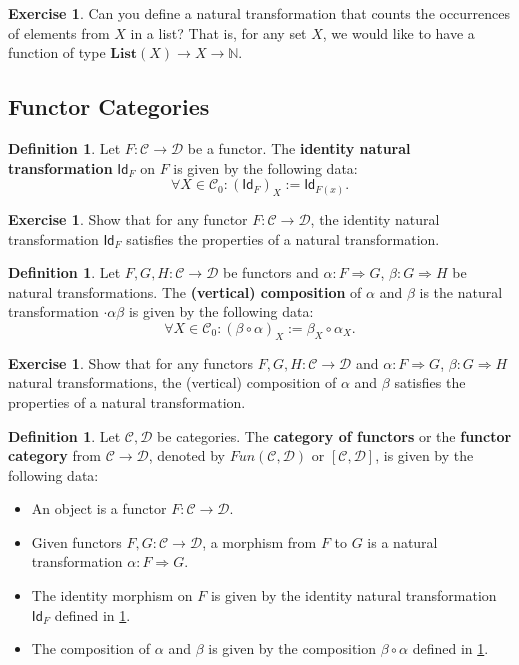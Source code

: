\documentclass[a4paper,10pt]{scrartcl}
\theoremstyle{plain}
\theoremstyle{definition}
\newtheorem{dfn}[thm]{Definition}
\newtheorem{exer}[thm]{Exercise}
\newcommand{\cfont}[1]{\ensuremath{\mathsf{#1}}}
\newcommand{\Cat}[1]{\mathcal{#1}}
\newcommand{\CC}{\Cat{C}}
\newcommand{\DD}{\Cat{D}}
\newcommand{\Catb}[1]{\mathbf{#1}}
\newcommand{\List}{\Catb{List}}
\newcommand{\Ob}[1]{{#1}_0}
\newcommand{\Id}[1][]{\cfont{Id}_{#1}}
\newcommand{\Comp}{\cdot}
\newcommand{\NatTrans}[3]{#1 : #2 \Rightarrow #3}
\newcommand{\co}[2]{\ensuremath{#2 \circ #1}}
\newcommand{\NN}{\ensuremath{\mathbb{N}}}
\begin{document}
\begin{exer}
  Can you define a natural transformation that counts the occurrences of elements from $X$ in a list?
  That is, for any set $X$, we would like to have a function of type $\List(X) \to X \to \NN$.
\end{exer}

\subsection{Functor Categories}
\begin{dfn}\label{dfn:nattrans_id} Let $F:\CC\to\DD$ be a functor. The \textbf{identity natural transformation} $\Id[F]$ on $F$ is given by the following data:
\[
\forall X\in\Ob{\CC}: (\Id[F])_{X} := \Id[F(x)].
\]
\end{dfn}

\begin{exer} Show that for any functor $F:\CC\to\DD$, the identity natural transformation $\Id[F]$ satisfies the properties of a natural transformation.
\end{exer}

\begin{dfn}\label{dfn:nattrans_comp} Let $F,G,H: \CC\to\DD$ be functors and $\NatTrans{\alpha}{F}{G}$, $\NatTrans{\beta}{G}{H}$ be natural transformations. The \textbf{(vertical) composition} of $\alpha$ and $\beta$ is the natural transformation $\Comp{\alpha}{\beta}$ is given by the following data:
\[
\forall X\in\Ob{\CC}: (\co{\alpha}{\beta})_{X} := \co{\alpha_X}{\beta_X}.
\]
\end{dfn}

\begin{exer} Show that for any functors $F,G,H: \CC\to\DD$ and $\NatTrans{\alpha}{F}{G}$, $\NatTrans{\beta}{G}{H}$ natural transformations, the (vertical) composition of $\alpha$ and $\beta$ satisfies the properties of a natural transformation.
\end{exer}

\begin{dfn} Let $\CC,\DD$ be categories. The \textbf{category of functors} or the \textbf{functor category} from $\CC\to\DD$, denoted by $Fun(\CC,\DD)$ or $[\CC,\DD]$, is given by the following data:
\begin{itemize}
\item An object is a functor $F:\CC\to\DD$.
\item Given functors $F, G:\CC\to\DD$, a morphism from $F$ to $G$ is a natural transformation $\NatTrans{\alpha}{F}{G}$.
\item The identity morphism on $F$ is given by the identity natural transformation $\Id[F]$ defined in \cref{dfn:nattrans_id}.
\item The composition of $\alpha$ and $\beta$ is given by the composition $\co{\alpha}{\beta}$ defined in \cref{dfn:nattrans_comp}.
\end{itemize}
\end{dfn}
\end{document}
